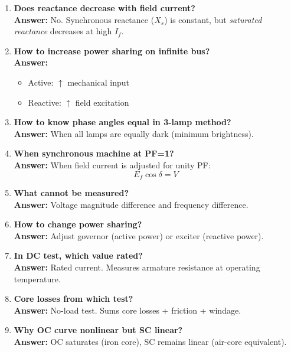\documentclass[12pt,a4paper]{article}
\begin{document}
\begin{enumerate}
		\item \textbf{Does reactance decrease with field current?} \\
		\textbf{Answer:} No. Synchronous reactance ($X_s$) is constant, but \textit{saturated reactance} decreases at high $I_f$.
		
		\item \textbf{How to increase power sharing on infinite bus?} \\
		\textbf{Answer:} 
		\begin{itemize}
			\item Active: $\uparrow$ mechanical input
			\item Reactive: $\uparrow$ field excitation
		\end{itemize}
		
		\item \textbf{How to know phase angles equal in 3-lamp method?} \\
		\textbf{Answer:} When all lamps are equally dark (minimum brightness).
		
		\item \textbf{When synchronous machine at PF=1?} \\
		\textbf{Answer:} When field current is adjusted for unity PF:
		\[
		E_f \cos\delta = V
		\]
		
		\item \textbf{What cannot be measured?} \\
		\textbf{Answer:} Voltage magnitude difference and frequency difference.
		
		\item \textbf{How to change power sharing?} \\
		\textbf{Answer:} Adjust governor (active power) or exciter (reactive power).
		
		\item \textbf{In DC test, which value rated?} \\
		\textbf{Answer:} Rated current. Measures armature resistance at operating temperature.
		
		\item \textbf{Core losses from which test?} \\
		\textbf{Answer:} No-load test. Sums core losses + friction + windage.
		
		\item \textbf{Why OC curve nonlinear but SC linear?} \\
		\textbf{Answer:} OC saturates (iron core), SC remains linear (air-core equivalent).
		

\end{enumerate}
\end{document}
